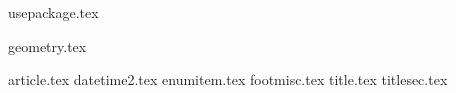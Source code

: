 
{usepackage.tex}


{geometry.tex}

{article.tex}
{datetime2.tex}
{enumitem.tex}
{footmisc.tex}
{title.tex}
{titlesec.tex}
